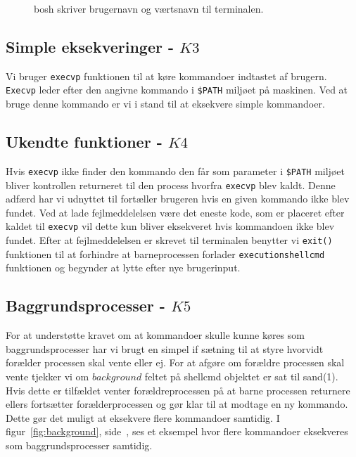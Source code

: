 \documentclass{article}
\begin{document}
\begin{figure}[H]
\caption{bosh skriver brugernavn og værtsnavn til terminalen.}
\label{fig:opstart}
\end{figure}

\subsection{Simple eksekveringer - $K3$}
Vi bruger \texttt{execvp} funktionen til at køre kommandoer indtastet af brugern. \texttt{Execvp} leder efter den angivne kommando i \texttt{\$PATH} miljøet på maskinen. Ved at bruge denne kommando er vi i stand til at eksekvere simple kommandoer. 

\subsection{Ukendte funktioner - $K4$}
Hvis \texttt{execvp} ikke finder den kommando den får som parameter i \texttt{\$PATH} miljøet bliver kontrollen returneret til den process hvorfra \texttt{execvp} blev kaldt. Denne adfærd har vi udnyttet til fortæller brugeren hvis en given kommando ikke blev fundet. Ved at lade fejlmeddelelsen være det eneste kode, som er placeret efter kaldet til \texttt{execvp} vil dette kun bliver eksekveret hvis kommandoen ikke blev fundet. Efter at fejlmeddelelsen er skrevet til terminalen benytter vi \texttt{exit()} funktionen til at forhindre at barneprocessen forlader \texttt{executionshellcmd} funktionen og begynder at lytte efter nye brugerinput.

\subsection{Baggrundsprocesser - $K5$}
For at understøtte kravet om at kommandoer skulle kunne køres som baggrundsprocesser har vi brugt en simpel if sætning til at styre hvorvidt forælder processen skal vente eller ej. For at afgøre om forældre processen skal vente tjekker vi om $background$ feltet på shellcmd objektet er sat til sand(1). Hvis dette er tilfældet venter forældreprocessen på at barne processen returnere ellers fortsætter forælderprocessen og gør klar til at modtage en ny kommando. Dette gør det muligt at eksekvere flere kommandoer samtidig.  I figur~\ref{fig:background}, side~\pageref{fig:background}, ses et eksempel hvor flere kommandoer eksekveres som baggrundsprocesser samtidig.
\end{document}
